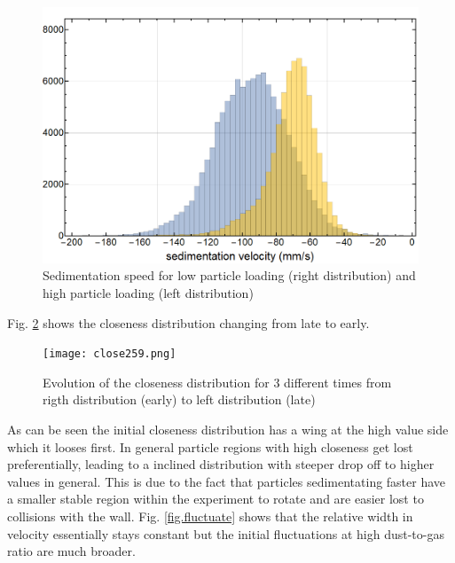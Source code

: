 \begin{figure}[h]
\includegraphics[width=\columnwidth]{veloc2and9.png}
    \caption{\label{fig.speed1} Sedimentation speed for low particle loading (right distribution) and high particle loading (left distribution)}
\end{figure}

Fig. \ref{fig.speed2} shows the closeness distribution changing from late to early.

\begin{figure}[h]
\texttt{[image: close259.png]}
    \caption{\label{fig.speed2} Evolution of the closeness distribution for 3 different times from rigth distribution (early) to left distribution (late)}
\end{figure}

As can be seen the initial closeness distribution has a wing at the high value side which it looses first. In general particle regions with high closeness get lost preferentially, leading to a inclined distribution with steeper drop off to higher values in general. 
This is due to the fact that particles sedimentating faster have a smaller stable region within the experiment to rotate and are easier lost to collisions with the wall.
Fig. \ref{fig.fluctuate} shows that the relative width in velocity essentially stays constant but the initial fluctuations at high dust-to-gas ratio are much broader.


